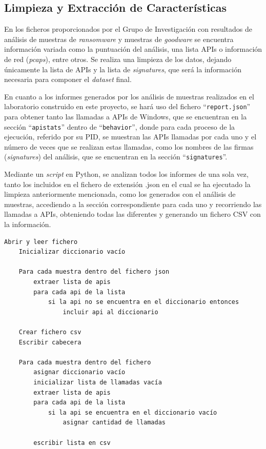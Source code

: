 \subsection{Limpieza y Extracción de Características} \label{sec:features}

\noindent En los ficheros proporcionados por el Grupo de Investigación \cite{GASS01} con resultados de análisis de muestras de \textit{ransomware} y muestras de \textit{goodware} se encuentra información variada como la puntuación del análisis, una lista \gls{API}s o información de red (\textit{pcaps}), entre otros. Se realiza una limpieza de los datos, dejando únicamente la lista de \gls{API}s y la lista de \textit{signatures}, que será la información necesaria para componer el \textit{dataset} final.

En cuanto a los informes generados por los análisis de muestras realizados en el laboratorio construido en este proyecto, se hará uso del fichero ``\verb!report.json!'' para obtener tanto las llamadas a \gls{API}s de Windows, que se encuentran en la sección ``\verb!apistats!'' dentro de ``\verb!behavior!'', donde para cada proceso de la ejecución, referido por su \gls{PID}, se muestran las \gls{API}s llamadas por cada uno y el número de veces que se realizan estas llamadas, como los nombres de las firmas (\textit{signatures}) del análisis, que se encuentran en la sección ``\verb!signatures!''.

Mediante un \textit{script} en Python, se analizan todos los informes de una sola vez, tanto los incluidos en el fichero de extensión .json en el cual se ha ejecutado la limpieza anteriormente mencionada, como los generados con el análisis de muestras, accediendo a la sección correspondiente para cada uno y recorriendo las llamadas a \gls{API}s, obteniendo todas las diferentes y generando un fichero \gls{CSV} con la información. 

\begin{algorithm}[htb!]
\renewcommand{\lstlistingname}{Algoritmo}
\begin{lstlisting}[language=config, caption={Pseudocódigo de análisis de informes ransomware}, captionpos=b, firstnumber=1, linewidth=14.4cm]
    Abrir y leer fichero
    Inicializar diccionario vacío

    Para cada muestra dentro del fichero json
        extraer lista de apis
        para cada api de la lista
            si la api no se encuentra en el diccionario entonces
                incluir api al diccionario

    Crear fichero csv
    Escribir cabecera

    Para cada muestra dentro del fichero
        asignar diccionario vacío
        inicializar lista de llamadas vacía
        extraer lista de apis
        para cada api de la lista
            si la api se encuentra en el diccionario vacío
                asignar cantidad de llamadas
                
        escribir lista en csv
        
    \end{lstlisting}
\label{Alg:imx}
\end{algorithm}

